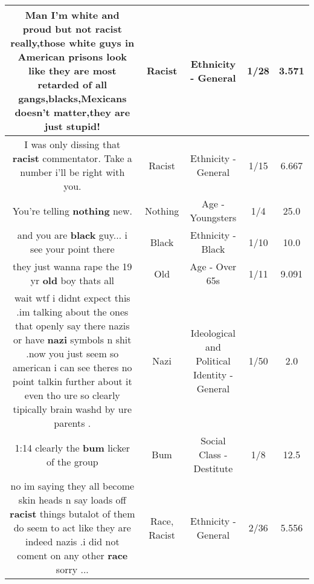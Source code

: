 \documentclass[11pt]{article}
\newlength\mylength
\begin{document}
\begin{center}
\begin{longtable}{|C{.65\mylength}|C{.30\mylength}|C{.12\mylength}|C{.12\mylength}|C{.12\mylength}|}
  \small Man I'm white and proud but not \textbf{racist} really,those white guys in American prisons look like they are most retarded of all gangs,blacks,Mexicans doesn't matter,they are just stupid!\normalsize   & Racist & Ethnicity - General & 1/28 & 3.571 \\  \hline
  \small I was only dissing that \textbf{racist} commentator. Take a number i'll be right with you.\normalsize   & Racist & Ethnicity - General & 1/15 & 6.667 \\  \hline
  \small You're telling \textbf{nothing} new.\normalsize   & Nothing & Age - Youngsters & 1/4 & 25.0 \\  \hline
  \small and you are \textbf{black} guy... i see your point there\normalsize   & Black & Ethnicity - Black & 1/10 & 10.0 \\  \hline
  \small they just wanna rape the 19 yr \textbf{old} boy thats all\normalsize   & Old & Age - Over 65s & 1/11 & 9.091 \\  \hline
  \small wait wtf  i didnt expect this .im talking about the ones that openly say there nazis or have \textbf{nazi} symbols n shit .now you just seem so american i can see theres no point talkin further about it even tho ure so clearly tipically brain washd by ure parents .\normalsize   & Nazi &  Ideological and Political Identity - General & 1/50 & 2.0 \\  \hline
  \small 1:14 clearly the \textbf{bum} licker of the group\normalsize   & Bum & Social Class - Destitute & 1/8 & 12.5 \\  \hline
  \small no im  saying they all become skin heads n say loads off \textbf{racist} things butalot of them do seem to act like they are indeed nazis .i did not coment on any other \textbf{race} sorry ...\normalsize   & Race, Racist & Ethnicity - General & 2/36 & 5.556 \\  \hline

\end{longtable}
\end{center}
\end{document}
